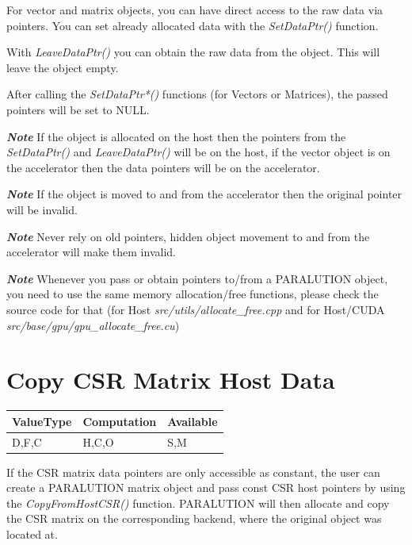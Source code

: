 For vector and matrix objects, you can have direct access to the raw data via pointers. You can set already allocated data with the \emph{SetDataPtr()} function. 




With \emph{LeaveDataPtr()} you can obtain the raw data from the object. This will leave the object empty.




After calling the \emph{SetDataPtr*()} functions (for Vectors or Matrices), the passed pointers will be set to NULL.

\textbf{\emph{Note}} If the object is allocated on the host then the pointers from the \emph{SetDataPtr()} and \emph{LeaveDataPtr()} will be on the host, if the vector object is on the accelerator then the data pointers will be on the accelerator.

\textbf{\emph{Note}} If the object is moved to and from the accelerator then the original pointer will be invalid.

\textbf{\emph{Note}} Never rely on old pointers, hidden object movement to and from the accelerator will make them invalid.

\textbf{\emph{Note}} Whenever you pass or obtain pointers to/from a PARALUTION object, you need to use the same memory allocation/free functions, please check the source code for that (for Host \emph{src/utils/allocate\_free.cpp} and for Host/CUDA \emph{src/base/gpu/gpu\_allocate\_free.cu})

\section{Copy CSR Matrix Host Data}

\begin{table}[H]
\begin{tabular}{l|l|l}
\multicolumn{1}{c|}{ValueType} & Computation & Available \\ \hline
D,F,C                          & H,C,O       & S,M
\end{tabular}
\end{table}

If the CSR matrix data pointers are only accessible as constant, the user can create a PARALUTION matrix object and pass const CSR host pointers by using the \emph{CopyFromHostCSR()} function. PARALUTION will then allocate and copy the CSR matrix on the corresponding backend, where the original object was located at.


